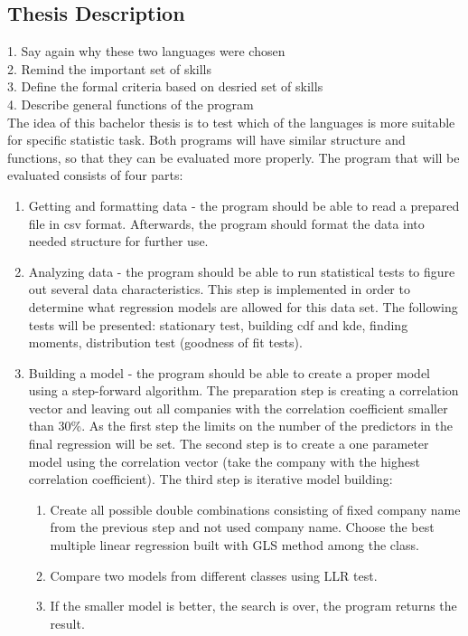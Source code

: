 \documentclass [twoside,
  11pt, a4paper,
  footinclude=true,
  headinclude=true,
  cleardoublepage=empty
]{article}
\begin{document}
\subsection{Thesis Description}
1. Say again why these two languages were chosen\\
2. Remind the important set of skills\\
3. Define the formal criteria based on desried set of skills\\
4. Describe general functions of the program\\
The idea of this bachelor thesis is to test which of the languages is more suitable for specific statistic task. Both programs will have similar structure and functions, so that they can be evaluated more properly. The program that will be evaluated consists of four parts:
\begin{enumerate}
    \item Getting and formatting data - the program should be able to read a prepared file in csv format. Afterwards, the program should format the data into needed structure for further use.
    \item Analyzing data - the program should be able to run statistical tests to figure out several data characteristics. This step is implemented in order to determine what regression models are allowed for this data set. The following tests will be presented: stationary test, building cdf and kde, finding moments, distribution test (goodness of fit tests).
    \item Building a model - the program should be able to create a proper model using a step-forward algorithm. The preparation step is creating a correlation vector and leaving out all companies with the correlation coefficient smaller than 30\%. As the first step the limits on the number of the predictors in the final regression will be set. The second step is to create a one parameter model using the correlation vector (take the company with the highest correlation coefficient). The third step is iterative model building: 
    \begin{enumerate}
        \item Create all possible double combinations consisting of fixed company name from the previous step and not used company name. Choose the best multiple linear regression built with GLS method among the class. 
        \item Compare two models from different classes using LLR test.
        \item If the smaller model is better, the search is over, the program returns the result.

\end{enumerate}
\end{enumerate}
\end{document}

